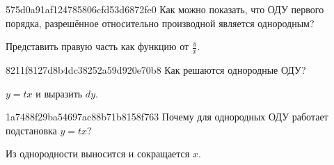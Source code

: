 \begin{note}{575d0a91af124785806cfd53d6872fe0}
    Как можно показать, что ОДУ первого порядка, разрешённое относительно производной является однородным?

    \begin{cloze}{1}
        Представить правую часть как функцию от \({ \frac{y}{x} }\).
    \end{cloze}
\end{note}

\begin{note}{8211f8127d8b4dc38252a59d920e70b8}
    Как решаются однородные ОДУ?

    \begin{cloze}{1}
        \({ y = tx }\) и выразить \({ dy }\).
    \end{cloze}
\end{note}

\begin{note}{1a7488f29ba54697ac88b71b8158f763}
    Почему для однородных ОДУ работает подстановка \({ y = tx }\)?

    \begin{cloze}{1}
        Из однородности выносится и сокращается \({ x }\).
    \end{cloze}
\end{note}


